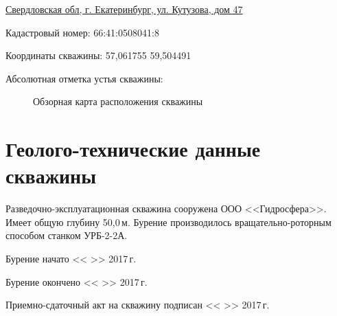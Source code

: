 \documentclass[a4paper,12pt]{article} %
\newcommand{\txtExecutor}{ООО <<Гидросфера>>}			%
\newcommand{\txtYear}{2017}			%
\newcommand{\txtAddress}{Свердловская обл, г. Екатеринбург, ул. Кутузова, дом 47}
\newcommand{\txtHeight}{ }							%
\newcommand{\txtCadaster}{66:41:0508041:8} 			%
\newcommand{\txtCoords}{57,061755 59,504491}		%
\newcommand{\txtDepth}{50,0}						%
\begin{document}
	\underline{\txtAddress}

	\bigskip

	
	Кадастровый номер: \txtCadaster

	Координаты скважины: \txtCoords
	
	Абсолютная отметка устья скважины: \txtHeight

	\begin{figure}[h]
		\caption{Обзорная карта расположения скважины}
	\end{figure}

    \section*{Геолого-технические данные скважины}

    Разведочно-эксплуатационная скважина сооружена \txtExecutor. Имеет общую глубину \txtDepth \,м.   Бурение производилось вращательно-роторным способом станком УРБ-2-2А.

    \bigskip

    Бурение начато << >> \txtYear \,г. 

	Бурение окончено << >> \txtYear \,г.

	Приемно-сдаточный акт на скважину подписан << >> \txtYear \,г.
	
\end{document}
